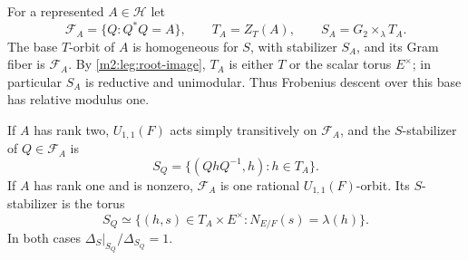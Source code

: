 For a represented $A\in\mathcal H$ let
\[
 \mathcal F_A=\{Q:Q^*Q=A\},\qquad T_A=Z_T(A),
 \qquad S_A=G_2\times_\lambda T_A.
\]
The base $T$-orbit of $A$ is homogeneous for $S$, with stabilizer $S_A$,
and its Gram fiber is $\mathcal F_A$.
By \cref{m2:leg:root-image}, $T_A$ is either $T$ or the scalar torus
$E^\times$; in particular $S_A$ is reductive and unimodular.
Thus Frobenius descent over this base has relative modulus one.

\begin{lemma}\label{m2:leg:gram-factorization}
If $A$ has rank two, $U_{1,1}(F)$ acts simply transitively on
$\mathcal F_A$, and the $S$-stabilizer of $Q\in\mathcal F_A$ is
\begin{equation}\label{m2:leg:rank-two-stabilizer}
 S_Q=\{(QhQ^{-1},h):h\in T_A\}.
\end{equation}
If $A$ has rank one and is nonzero, $\mathcal F_A$ is one rational
$U_{1,1}(F)$-orbit. Its $S$-stabilizer is the torus
\begin{equation}\label{m2:leg:rank-one-stabilizer}
 S_Q\simeq\{(h,s)\in T_A\times E^\times:
                                      N_{E/F}(s)=\lambda(h)\}.
\end{equation}
In both cases $\Delta_S|_{S_Q}/\Delta_{S_Q}=1$.
\end{lemma}

